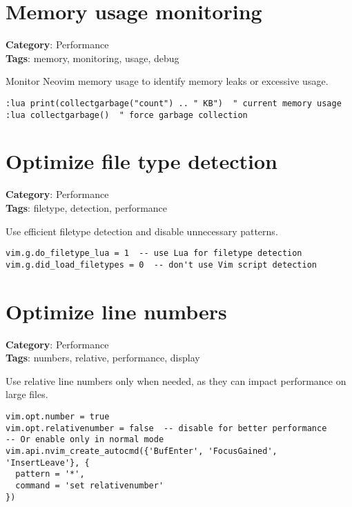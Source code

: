 {{{{{{{{{{\section{Memory usage monitoring}

\textbf{Category}: Performance\\ \textbf{Tags}: memory, monitoring, usage, debug
\vspace{0.5cm}

Monitor Neovim memory usage to identify memory leaks or excessive usage.

\begin{Exa*}{}
\begin{Verbatim}[fontsize=\footnotesize, breaklines, breakanywhere]
:lua print(collectgarbage("count") .. " KB")  " current memory usage
:lua collectgarbage()  " force garbage collection
\end{Verbatim}
\end{Exa*}

\section{Optimize file type detection}

\textbf{Category}: Performance\\ \textbf{Tags}: filetype, detection, performance
\vspace{0.5cm}

Use efficient filetype detection and disable unnecessary patterns.

\begin{Exa*}{}
\begin{Verbatim}[fontsize=\footnotesize, breaklines, breakanywhere]
vim.g.do_filetype_lua = 1  -- use Lua for filetype detection
vim.g.did_load_filetypes = 0  -- don't use Vim script detection
\end{Verbatim}
\end{Exa*}

\section{Optimize line numbers}

\textbf{Category}: Performance\\ \textbf{Tags}: numbers, relative, performance, display
\vspace{0.5cm}

Use relative line numbers only when needed, as they can impact performance on large files.

\begin{Exa*}{}
\begin{Verbatim}[fontsize=\footnotesize, breaklines, breakanywhere]
vim.opt.number = true
vim.opt.relativenumber = false  -- disable for better performance
-- Or enable only in normal mode
vim.api.nvim_create_autocmd({'BufEnter', 'FocusGained', 'InsertLeave'}, {
  pattern = '*',
  command = 'set relativenumber'
})
\end{Verbatim}
\end{Exa*}

}}}}}}}}}}
